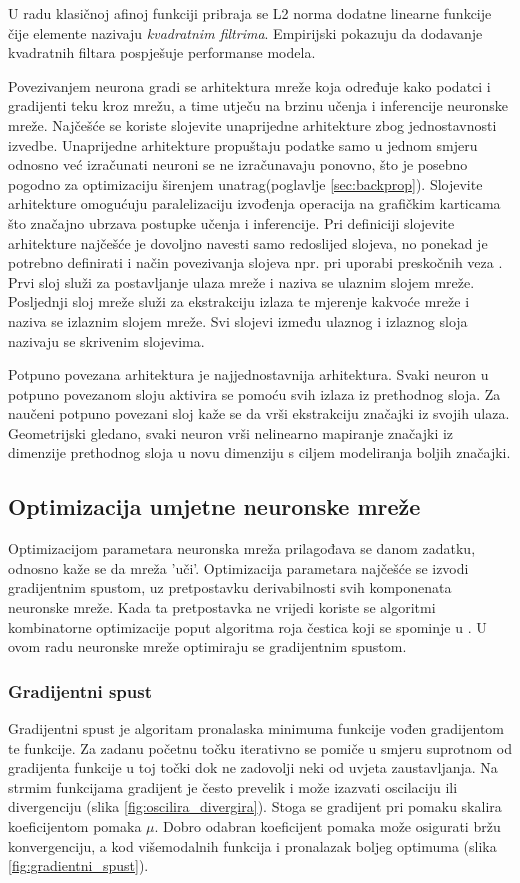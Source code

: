 \documentclass[times, utf8, numeric, diplomski]{fer}
\def\figref#1{(slika \ref{#1})}
\def\secref#1{(poglavlje \ref{#1})}
\begin{document}
U radu \citet{softsign} klasičnoj afinoj funkciji pribraja se L2 norma dodatne linearne funkcije čije elemente nazivaju \textit{kvadratnim filtrima}. Empirijski pokazuju da dodavanje kvadratnih filtara pospješuje performanse modela.

Povezivanjem neurona gradi se arhitektura mreže koja određuje kako podatci i gradijenti teku kroz mrežu, a time utječu na brzinu učenja i inferencije neuronske mreže. Najčešće se koriste slojevite unaprijedne arhitekture zbog jednostavnosti izvedbe. Unaprijedne arhitekture propuštaju podatke samo u jednom smjeru odnosno već izračunati neuroni se ne izračunavaju ponovno, što je posebno pogodno za optimizaciju širenjem unatrag\secref{sec:backprop}. Slojevite arhitekture omogućuju paralelizaciju izvođenja operacija na grafičkim karticama što značajno ubrzava postupke učenja i inferencije. Pri definiciji slojevite arhitekture najčešće je dovoljno navesti samo redoslijed slojeva, no ponekad je potrebno definirati i način povezivanja slojeva npr. pri uporabi preskočnih veza \citep{highwaynet, resnet, densenet}. Prvi sloj služi za postavljanje ulaza mreže i naziva se ulaznim slojem mreže. Posljednji sloj mreže služi za ekstrakciju izlaza te mjerenje kakvoće mreže i naziva se izlaznim slojem mreže. Svi slojevi između ulaznog i izlaznog sloja nazivaju se skrivenim slojevima.

Potpuno povezana arhitektura je najjednostavnija arhitektura. Svaki neuron u potpuno povezanom sloju aktivira se pomoću svih izlaza iz prethodnog sloja. Za naučeni potpuno povezani sloj kaže se da vrši ekstrakciju značajki iz svojih ulaza. Geometrijski gledano, svaki neuron vrši nelinearno mapiranje značajki iz dimenzije prethodnog sloja u novu dimenziju s ciljem modeliranja boljih značajki.

\subsection{Optimizacija umjetne neuronske mreže}
Optimizacijom parametara neuronska mreža prilagođava se danom zadatku, odnosno kaže se da mreža 'uči'. Optimizacija parametara najčešće se izvodi gradijentnim spustom, uz pretpostavku derivabilnosti svih komponenata neuronske mreže. Kada ta pretpostavka ne vrijedi koriste se algoritmi kombinatorne optimizacije poput algoritma roja čestica koji se spominje u \citet{skripta_nenr}. U ovom radu neuronske mreže optimiraju se gradijentnim spustom.

\subsubsection{Gradijentni spust}
\label{sec:gradijentni_spust}
Gradijentni spust je algoritam pronalaska minimuma funkcije vođen gradijentom te funkcije. Za zadanu početnu točku iterativno se pomiče u smjeru suprotnom od gradijenta funkcije u toj točki dok ne zadovolji neki od uvjeta zaustavljanja. Na strmim funkcijama gradijent je često prevelik i može izazvati oscilaciju ili divergenciju \figref{fig:oscilira_divergira}. Stoga se gradijent pri pomaku skalira koeficijentom pomaka $\mu$. Dobro odabran koeficijent pomaka može osigurati bržu konvergenciju, a kod višemodalnih funkcija i pronalazak boljeg optimuma \figref{fig:gradientni_spust}.
\end{document}
